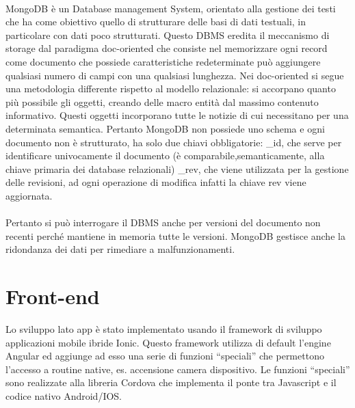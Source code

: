\paragraph{}


MongoDB è un Database management System, orientato alla gestione dei testi che ha come obiettivo quello di strutturare delle basi di dati testuali, in particolare con dati poco strutturati.
Questo DBMS eredita il meccanismo di storage dal paradigma doc-oriented che consiste nel memorizzare ogni record come documento che possiede caratteristiche redeterminate può aggiungere qualsiasi numero di campi con una qualsiasi lunghezza.
Nei doc-oriented si segue una metodologia differente rispetto al modello relazionale: si accorpano quanto più possibile gli oggetti, creando delle macro entità dal massimo contenuto informativo. Questi oggetti incorporano tutte le notizie di cui necessitano per una determinata semantica.
Pertanto MongoDB non possiede uno schema e ogni documento non è strutturato, ha solo due chiavi obbligatorie:
_id, che serve per identificare univocamente il documento (è comparabile,semanticamente, alla chiave primaria dei database relazionali)
_rev, che viene utilizzata per la gestione delle revisioni, ad ogni operazione di modifica infatti la chiave rev viene aggiornata.
\paragraph{}

Pertanto si può interrogare il DBMS anche per versioni del documento non recenti perché mantiene in memoria tutte le versioni.
MongoDB gestisce anche la ridondanza dei dati per rimediare a malfunzionamenti.
\paragraph{}




\section{Front-end}


Lo sviluppo lato app è stato implementato usando il framework di sviluppo applicazioni mobile ibride Ionic.
Questo framework utilizza di default l’engine Angular ed aggiunge ad esso una serie di funzioni “speciali” che permettono l’accesso a routine native, es. accensione camera dispositivo. Le funzioni “speciali” sono realizzate alla libreria Cordova che implementa il ponte tra Javascript e il codice nativo Android/IOS.

